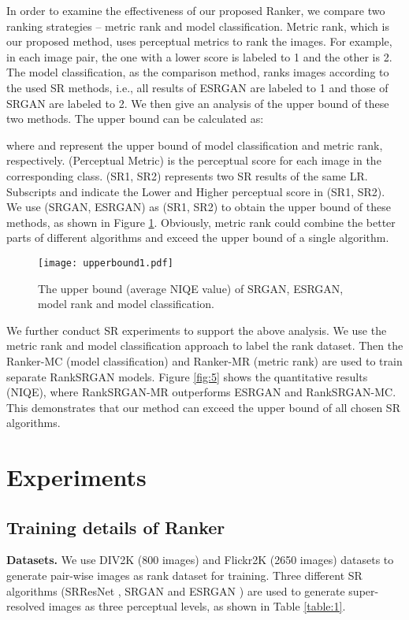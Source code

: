 \documentclass[10pt,twocolumn,letterpaper]{article}
\begin{document}
In order to examine the effectiveness of our proposed Ranker, we compare two ranking strategies -- metric rank and model classification. Metric rank, which is our proposed method, uses perceptual metrics to rank the images. For example, in each image pair, the one with a lower score is labeled to 1 and the other is 2. The model classification, as the comparison method, ranks images according to the used SR methods, i.e., all results of ESRGAN are labeled to 1 and those of SRGAN are labeled to 2. We then give an analysis of the upper bound of these two methods. The upper bound can be calculated as:
\begin{small}

\end{small}where  and  represent the upper bound of model classification and metric rank, respectively.  (Perceptual Metric) is the perceptual score for each image in the corresponding class. (SR1, SR2) represents two SR results of the same LR. Subscripts  and  indicate the Lower and Higher perceptual score in (SR1, SR2). We use (SRGAN, ESRGAN) as (SR1, SR2) to obtain the upper bound of these methods, as shown in Figure \ref{fig:4}. Obviously, metric rank could combine the better parts of different algorithms and exceed the upper bound of a single algorithm.

\begin{figure}[t]
\setlength{\abovecaptionskip}{-0.2cm}
\setlength{\belowcaptionskip}{-0.2cm}
\begin{center}
	\texttt{[image: upperbound1.pdf]} 

\end{center}
   \caption{The upper bound (average NIQE value) of SRGAN, ESRGAN, model rank and model classification.}
\label{fig:4}
\vskip -0.4cm
\end{figure}
We further conduct SR experiments to support the above analysis. We use the metric rank and model classification approach to label the rank dataset. Then the Ranker-MC (model classification) and Ranker-MR (metric rank) are used to train separate RankSRGAN models. Figure \ref{fig:5} shows the quantitative results (NIQE), where RankSRGAN-MR outperforms ESRGAN and RankSRGAN-MC. This demonstrates that our method can exceed the upper bound of all chosen SR algorithms.

\section{Experiments}
\subsection{Training details of Ranker}
\label{4.1}
\textbf{Datasets.} We use DIV2K (800 images) \cite{agustsson2017ntire} and Flickr2K (2650 images) \cite{agustsson2017ntire} datasets to generate pair-wise images as rank dataset for training. Three different SR algorithms (SRResNet \cite{ledig2017photo}, SRGAN \cite{ledig2017photo} and ESRGAN \cite{Wang_2018_ECCV_Workshops}) are used to generate super-resolved images as three perceptual levels, as shown in Table \ref{table:1}. 
\vskip -0.2cm
\end{document}
